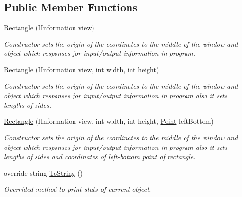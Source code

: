 \subsection*{Public Member Functions}
\begin{DoxyCompactItemize}
\item 
\mbox{\hyperlink{class_home_work_1_1_task_library_1_1_tasks_1_1_lesson6_1_1_task1_1_1_classes_1_1_rectangle_acda8d79357e5d833876045c9c42ec413}{Rectangle}} (I\+Information view)
\begin{DoxyCompactList}\small\item\em Constructor sets the origin of the coordinates to the middle of the window and object which responses for input/output information in program. \end{DoxyCompactList}\item 
\mbox{\hyperlink{class_home_work_1_1_task_library_1_1_tasks_1_1_lesson6_1_1_task1_1_1_classes_1_1_rectangle_a5ac93eca63cd4ab6f1736eaf4c6157b4}{Rectangle}} (I\+Information view, int width, int height)
\begin{DoxyCompactList}\small\item\em Constructor sets the origin of the coordinates to the middle of the window and object which responses for input/output information in program also it sets lengths of sides. \end{DoxyCompactList}\item 
\mbox{\hyperlink{class_home_work_1_1_task_library_1_1_tasks_1_1_lesson6_1_1_task1_1_1_classes_1_1_rectangle_a10fa9c317ecb2859e6c4fb87bff73c3b}{Rectangle}} (I\+Information view, int width, int height, \mbox{\hyperlink{struct_home_work_1_1_task_library_1_1_tasks_1_1_lesson6_1_1_task1_1_1_classes_1_1_point}{Point}} left\+Bottom)
\begin{DoxyCompactList}\small\item\em Constructor sets the origin of the coordinates to the middle of the window and object which responses for input/output information in program also it sets lengths of sides and coordinates of left-\/bottom point of rectangle. \end{DoxyCompactList}\item 
override string \mbox{\hyperlink{class_home_work_1_1_task_library_1_1_tasks_1_1_lesson6_1_1_task1_1_1_classes_1_1_rectangle_afc15463fc68808e39b2bc7d791582260}{To\+String}} ()
\begin{DoxyCompactList}\small\item\em Overrided method to print stats of current object. \end{DoxyCompactList}\item 

\end{DoxyCompactItemize}
